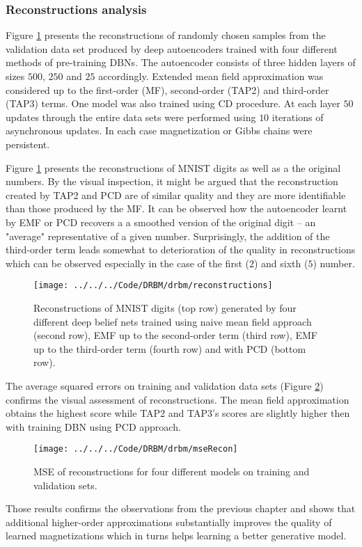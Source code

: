 \documentclass[../report/report.tex]{subfiles}
\begin{document}
\subsubsection{Reconstructions analysis}
Figure \ref{fig:drbm} presents the reconstructions of randomly chosen samples from the validation data set produced by deep autoencoders trained with four different methods of pre-training DBNs. The autoencoder consists of three hidden layers of sizes $500$, $250$ and $25$ accordingly. Extended mean field approximation was considered up to the first-order (MF), second-order (TAP2) and third-order (TAP3) terms. One model was also trained using CD procedure. At each layer $50$ updates through the entire data sets were performed using $10$ iterations of asynchronous updates. In each case magnetization or Gibbs chains were persistent.

Figure \ref{fig:drbm} presents the reconstructions of MNIST digits as well as a the original numbers. By the visual inspection, it might be argued that the reconstruction created by TAP2 and PCD are of similar quality and they are more identifiable than those produced by the MF. 
It can be observed how the autoencoder learnt by EMF or PCD recovers a a smoothed version of the original digit -- an "average" representative of a given number. Surprisingly, the addition of the third-order term leads somewhat to deterioration of the quality in reconstructions which can be observed especially in the case of the first ($2$) and sixth ($5$) number. 
\begin{figure}[!htb]
\texttt{[image: ../../../Code/DRBM/drbm/reconstructions]}
  \caption[1]{Reconstructions of MNIST digits (top row) generated by four different deep belief nets trained using naive mean field approach (second row), EMF up to the second-order term (third row), EMF up to the third-order term (fourth row) and with PCD (bottom row).}
\label{fig:drbm}
\end{figure}

The average squared errors on training and validation data sets (Figure \ref{fig:mse}) confirms the visual assessment of reconstructions. The mean field approximation obtains the highest score while TAP2 and TAP3's scores are slightly higher then with training DBN using PCD approach. 

\begin{figure}[!htb]
\begin{center}
 \texttt{[image: ../../../Code/DRBM/drbm/mseRecon]}
\end{center}
  \caption[1]{MSE of reconstructions for four different models on training and validation sets.}
\label{fig:mse}
\end{figure}

Those results confirms the observations from the previous chapter and shows that additional higher-order approximations substantially improves the quality of learned magnetizations which in turns helps learning a better generative model.
\end{document}
